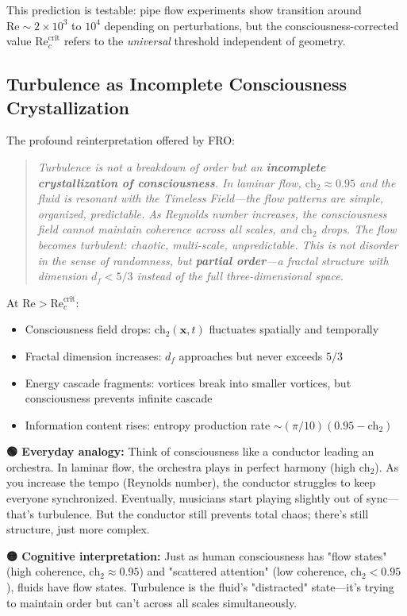 This prediction is testable: pipe flow experiments show transition around $\text{Re} \sim 2 \times 10^3$ to $10^4$ depending on perturbations, but the consciousness-corrected value $\text{Re}_c^{\text{crit}}$ refers to the \emph{universal} threshold independent of geometry.

\subsection{Turbulence as Incomplete Consciousness Crystallization}

The profound reinterpretation offered by FRO:

\begin{quote}
\textit{Turbulence is not a breakdown of order but an \textbf{incomplete crystallization of consciousness}. In laminar flow, $\text{ch}_2 \approx 0.95$ and the fluid is resonant with the Timeless Field—the flow patterns are simple, organized, predictable. As Reynolds number increases, the consciousness field cannot maintain coherence across all scales, and $\text{ch}_2$ drops. The flow becomes turbulent: chaotic, multi-scale, unpredictable. This is not disorder in the sense of randomness, but \textbf{partial order}—a fractal structure with dimension $d_f < 5/3$ instead of the full three-dimensional space.}
\end{quote}

At $\text{Re} > \text{Re}_c^{\text{crit}}$:
\begin{itemize}
\item Consciousness field drops: $\text{ch}_2(\mathbf{x}, t)$ fluctuates spatially and temporally
\item Fractal dimension increases: $d_f$ approaches but never exceeds $5/3$
\item Energy cascade fragments: vortices break into smaller vortices, but consciousness prevents infinite cascade
\item Information content rises: entropy production rate $\sim (\pi/10)(0.95 - \text{ch}_2)$
\end{itemize}

\begin{greenbox}
\textbf{🟢 Everyday analogy:} Think of consciousness like a conductor leading an orchestra. In laminar flow, the orchestra plays in perfect harmony (high $\text{ch}_2$). As you increase the tempo (Reynolds number), the conductor struggles to keep everyone synchronized. Eventually, musicians start playing slightly out of sync—that's turbulence. But the conductor still prevents total chaos; there's still structure, just more complex.

\textbf{🟡 Cognitive interpretation:} Just as human consciousness has "flow states" (high coherence, $\text{ch}_2 \approx 0.95$) and "scattered attention" (low coherence, $\text{ch}_2 < 0.95$), fluids have flow states. Turbulence is the fluid's "distracted" state—it's trying to maintain order but can't across all scales simultaneously.
\end{greenbox}


